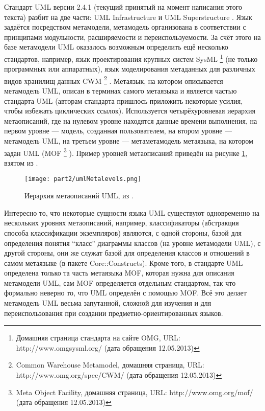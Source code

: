 Стандарт UML версии 2.4.1 (текущий принятый на момент написания этого текста) разбит 
на две части: UML Infrastructure \cite{omg2011infrastructure} и UML Superstructure 
\cite{omg2011superstructure}. Язык задаётся посредством метамодели, метамодель организована 
в соответствии с принципами модульности, расширяемости и переиспользуемости. За счёт 
этого на базе метамодели UML оказалось возможным определить ещё несколько стандартов, например, язык проектирования крупных систем SysML%
\footnote{Домашняя страница стандарта на сайте OMG, URL: http://www.omgsysml.org/ (дата обращения 12.05.2013)}
(не только программных или аппаратных), язык моделирования метаданных для различных видов хранилищ данных CWM%
\footnote{Common Warehouse Metamodel, домашняя страница, URL: http://www.omg.org/spec/CWM/ (дата обращения 12.05.2013)}%
. Метаязык, на котором описывается метамодель UML, описан в терминах самого метаязыка и является 
частью стандарта UML (авторам стандарта пришлось приложить некоторые усилия, чтобы 
избежать циклических ссылок). Используется четырёхуровневая иерархия метаописаний, 
где на нулевом уровне находятся данные времени выполнения, на первом уровне --- модель, 
созданная пользователем, на втором уровне --- метамодель UML, на третьем уровне --- метаметамодель метаязыка, на котором задан UML (MOF%
\footnote{Meta Object Facility, домашняя страница, URL: http://www.omg.org/mof/ (дата обращения 12.05.2013)}%
). Пример уровней метаописаний приведён на рисунке \ref{umlMetalevels}, взятом из \cite{omg2011infrastructure}.

\begin{figure} [ht]
	\begin{center}
		\texttt{[image: part2/umlMetalevels.png]}
		\caption{Иерархия метаописаний UML, из \cite{omg2011infrastructure}.}
		\label{umlMetalevels}
	\end{center}
\end{figure}

Интересно то, что некоторые сущности языка UML существуют одновременно на нескольких 
уровнях метаописаний, например, классификаторы (абстракция способа классификации экземпляров) 
являются, с одной стороны, базой для определения понятия "`класс"' диаграммы классов 
(на уровне метамодели UML), с другой стороны, они же служат базой для определения 
классов и отношений в самом метаязыке (в пакете Core::Constructs). Кроме того, в стандарте 
UML определена только та часть метаязыка MOF, которая нужна для описания метамодели UML, 
сам MOF определяется отдельным стандартом, так что формально неверно то, что UML определён 
с помощью MOF. Всё это делает метамодель UML весьма запутанной, сложной для изучения 
и для переиспользования при создании предметно-ориентированных языков.

